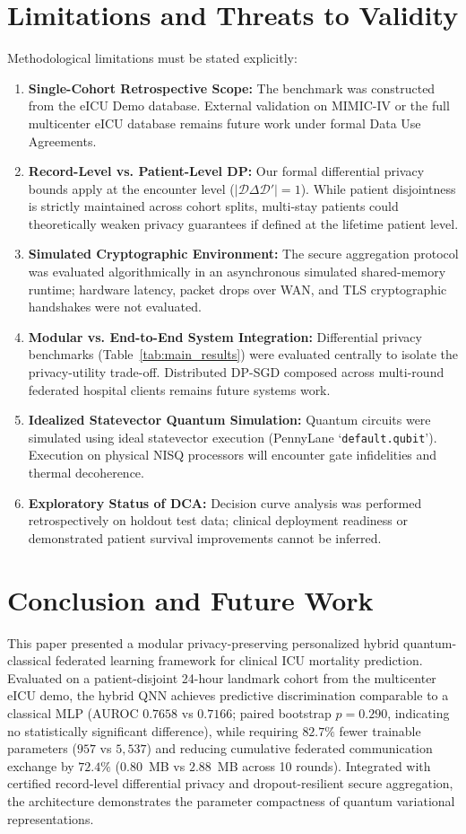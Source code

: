 \documentclass[conference]{IEEEtran}
\begin{document}
\section{Limitations and Threats to Validity}
Methodological limitations must be stated explicitly:
\begin{enumerate}
    \item \textbf{Single-Cohort Retrospective Scope:} The benchmark was constructed from the eICU Demo database. External validation on MIMIC-IV or the full multicenter eICU database remains future work under formal Data Use Agreements.
    \item \textbf{Record-Level vs. Patient-Level DP:} Our formal differential privacy bounds apply at the encounter level ($|\mathcal{D} \Delta \mathcal{D}'| = 1$). While patient disjointness is strictly maintained across cohort splits, multi-stay patients could theoretically weaken privacy guarantees if defined at the lifetime patient level.
    \item \textbf{Simulated Cryptographic Environment:} The secure aggregation protocol was evaluated algorithmically in an asynchronous simulated shared-memory runtime; hardware latency, packet drops over WAN, and TLS cryptographic handshakes were not evaluated.
    \item \textbf{Modular vs. End-to-End System Integration:} Differential privacy benchmarks (Table~\ref{tab:main_results}) were evaluated centrally to isolate the privacy-utility trade-off. Distributed DP-SGD composed across multi-round federated hospital clients remains future systems work.
    \item \textbf{Idealized Statevector Quantum Simulation:} Quantum circuits were simulated using ideal statevector execution (PennyLane `\texttt{default.qubit}'). Execution on physical NISQ processors will encounter gate infidelities and thermal decoherence.
    \item \textbf{Exploratory Status of DCA:} Decision curve analysis was performed retrospectively on holdout test data; clinical deployment readiness or demonstrated patient survival improvements cannot be inferred.
\end{enumerate}

\section{Conclusion and Future Work}
This paper presented a modular privacy-preserving personalized hybrid quantum-classical federated learning framework for clinical ICU mortality prediction. Evaluated on a patient-disjoint 24-hour landmark cohort from the multicenter eICU demo, the hybrid QNN achieves predictive discrimination comparable to a classical MLP (AUROC $0.7658$ vs $0.7166$; paired bootstrap $p = 0.290$, indicating no statistically significant difference), while requiring $82.7\%$ fewer trainable parameters ($957$ vs $5,537$) and reducing cumulative federated communication exchange by $72.4\%$ ($0.80$~MB vs $2.88$~MB across 10 rounds). Integrated with certified record-level differential privacy and dropout-resilient secure aggregation, the architecture demonstrates the parameter compactness of quantum variational representations.
\end{document}
